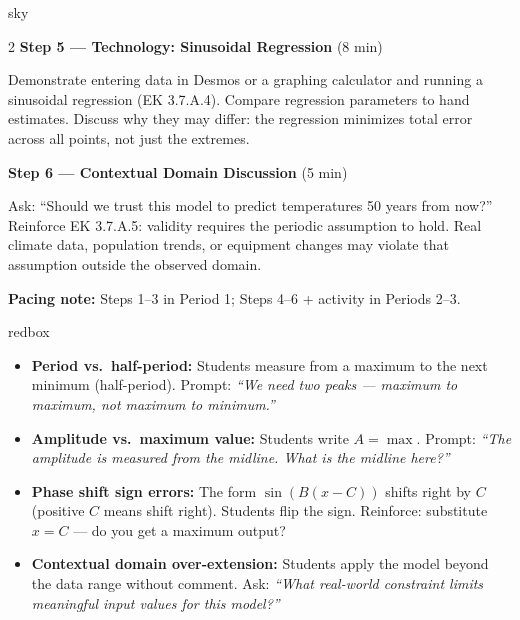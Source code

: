 \documentclass[10pt]{article}
\begin{document}
\begin{skillbox}{sky}
\begin{multicols}{2}
\textbf{Step 5 --- Technology: Sinusoidal Regression} (8 min)

Demonstrate entering data in Desmos or a graphing calculator and running a
sinusoidal regression (EK 3.7.A.4). Compare regression parameters to hand
estimates. Discuss why they may differ: the regression minimizes total error
across all points, not just the extremes.

\columnbreak

\textbf{Step 6 --- Contextual Domain Discussion} (5 min)

Ask: ``Should we trust this model to predict temperatures 50 years from now?''
Reinforce EK 3.7.A.5: validity requires the periodic assumption to hold.
Real climate data, population trends, or equipment changes may violate that
assumption outside the observed domain.

\end{multicols}

\smallskip
\textbf{Pacing note:} Steps 1--3 in Period 1; Steps 4--6 + activity in Periods 2--3.
\end{skillbox}

\vspace{0.08in}

\begin{skillbox}{redbox}
\begin{itemize}[leftmargin=1.4em, itemsep=3pt]
  \item \textbf{Period vs.\ half-period:} Students measure from a maximum to the
    next minimum (half-period). Prompt: \textit{``We need two \emph{peaks} --- maximum
    to maximum, not maximum to minimum.''}
  \item \textbf{Amplitude vs.\ maximum value:} Students write $A = \max$. Prompt:
    \textit{``The amplitude is measured from the midline. What is the midline here?''}
  \item \textbf{Phase shift sign errors:} The form $\sin(B(x - C))$ shifts right by
    $C$ (positive $C$ means shift right). Students flip the sign. Reinforce: substitute
    $x = C$ --- do you get a maximum output?
  \item \textbf{Contextual domain over-extension:} Students apply the model beyond
    the data range without comment. Ask: \textit{``What real-world constraint limits
    meaningful input values for this model?''}
\end{itemize}
\end{skillbox}
\end{document}
